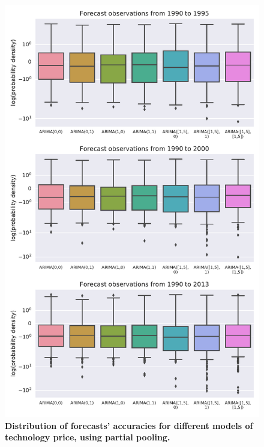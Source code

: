 \documentclass{article}
\begin{document}
\begin{figure}
    \centering
    \includegraphics[height=.75\textheight]{figs/Pooled_Models_Forecast_Quality_Price.pdf}
    \caption{\textbf{Distribution of forecasts' accuracies for different models of technology price, using partial pooling.}}\label{fig:Pooled_Models_Forecast_Quality_Price}
\end{figure}
\end{document}
